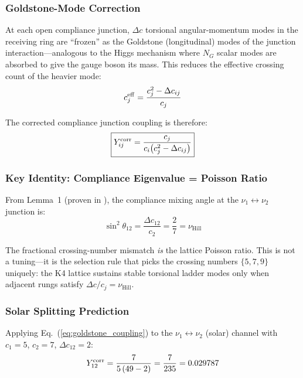 \subsubsection{Goldstone-Mode Correction}

At each open compliance junction, $\Delta c$ torsional angular-momentum modes in the
receiving ring are ``frozen'' as the Goldstone (longitudinal) modes of the junction
interaction---analogous to the Higgs mechanism where $N_G$ scalar modes are absorbed
to give the gauge boson its mass.  This reduces the effective crossing count of the
heavier mode:
\begin{equation}
    c_j^{\rm eff} = \frac{c_j^2 - \Delta c_{ij}}{c_j}
\end{equation}

The corrected compliance junction coupling is therefore:
\begin{equation}
    \boxed{Y_{ij}^{\rm corr} = \frac{c_j}{c_i\bigl(c_j^2 - \Delta c_{ij}\bigr)}}
    \label{eq:goldstone_coupling}
\end{equation}

\subsubsection{Key Identity: Compliance Eigenvalue = Poisson Ratio}

From Lemma~1 (proven in ), the compliance mixing angle at the $\nu_1\leftrightarrow\nu_2$ junction is:
\begin{equation}
    \sin^2\theta_{12} = \frac{\Delta c_{12}}{c_2} = \frac{2}{7} = \nu_{\text{Hill}}
\end{equation}

The fractional crossing-number mismatch \emph{is} the lattice Poisson ratio.  This is not a tuning---it is the selection rule that picks the crossing numbers $\{5,7,9\}$ uniquely: the K4 lattice sustains stable torsional ladder modes only when adjacent rungs satisfy $\Delta c / c_j = \nu_{\text{Hill}}$.

\subsubsection{Solar Splitting Prediction}

Applying Eq.~(\ref{eq:goldstone_coupling}) to the $\nu_1\leftrightarrow\nu_2$ (solar) channel with $c_1=5$, $c_2=7$, $\Delta c_{12}=2$:
\begin{equation}
    Y_{12}^{\rm corr} = \frac{7}{5\,(49-2)} = \frac{7}{235} = 0.029787
    \label{eq:solar_coupling}
\end{equation}

